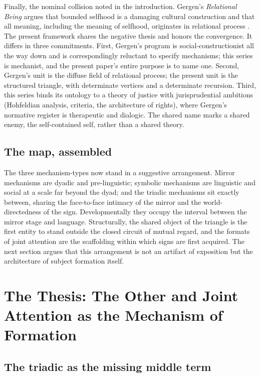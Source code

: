 \documentclass[11pt,a4paper]{article}
\theoremstyle{seriesthm}
\begin{document}
Finally, the nominal collision noted in the introduction. Gergen's \emph{Relational Being} argues that bounded selfhood is a damaging cultural construction and that all meaning, including the meaning of selfhood, originates in relational process \parencite{gergen2009}. The present framework shares the negative thesis and honors the convergence. It differs in three commitments. First, Gergen's program is social-constructionist all the way down and is correspondingly reluctant to specify mechanisms; this series is mechanist, and the present paper's entire purpose is to name one. Second, Gergen's unit is the diffuse field of relational process; the present unit is the structured triangle, with determinate vertices and a determinate recursion. Third, this series binds its ontology to a theory of justice with jurisprudential ambitions (Hohfeldian analysis, criteria, the architecture of rights), where Gergen's normative register is therapeutic and dialogic. The shared name marks a shared enemy, the self-contained self, rather than a shared theory.

\subsection{The map, assembled}

The three mechanism-types now stand in a suggestive arrangement. Mirror mechanisms are dyadic and pre-linguistic; symbolic mechanisms are linguistic and social at a scale far beyond the dyad; and the triadic mechanisms sit exactly between, sharing the face-to-face intimacy of the mirror and the world-directedness of the sign. Developmentally they occupy the interval between the mirror stage and language. Structurally, the shared object of the triangle is the first entity to stand outside the closed circuit of mutual regard, and the formats of joint attention are the scaffolding within which signs are first acquired. The next section argues that this arrangement is not an artifact of exposition but the architecture of subject formation itself.

\section{The Thesis: The Other and Joint Attention as the Mechanism of Formation}
\label{p05:sec:thesis}

\subsection{The triadic as the missing middle term}
\end{document}
